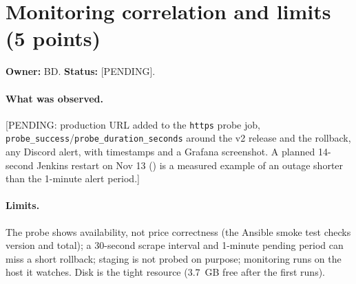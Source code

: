 \section{Monitoring correlation and limits (5 points)}\label{Section:deliveryMonitoring}
\textbf{Owner:} BD. \textbf{Status:} [PENDING].

\paragraph{What was observed.} [PENDING: production URL added to the \texttt{https} probe job, \texttt{probe\_success}/\texttt{probe\_duration\_seconds} around the v2 release and
the rollback, any Discord alert, with timestamps and a Grafana screenshot. A planned 14-second Jenkins restart on Nov 13 () is a measured example of an outage shorter than the 1-minute alert period.]

\paragraph{Limits.} The probe shows availability, not price correctness (the Ansible smoke test checks version and total); a 30-second scrape interval and 1-minute pending period can miss
a short rollback; staging is not probed on purpose; monitoring runs on the host it watches. Disk is the tight resource (3.7~GB free after the first runs).
